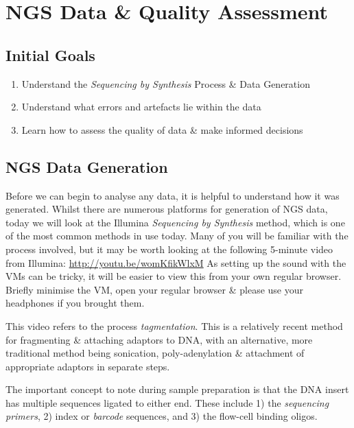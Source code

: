 \chapter{NGS Data \& Quality Assessment}

\section{Initial Goals}

\begin{enumerate}
\item Understand the \textit{Sequencing by Synthesis} Process \& Data Generation \\
\item Understand what errors and artefacts lie within the data \\
\item Learn how to assess the quality of data \& make informed decisions \\
\end{enumerate}

\section{NGS Data Generation}
\begin{steps}
Before we can begin to analyse any data, it is helpful to understand how it was generated.
Whilst there are numerous platforms for generation of NGS data, today we will look at the Illumina \textit{Sequencing by Synthesis} method, which is one of the most common methods in use today.
Many of you will be familiar with the process involved, but it may be worth looking at the following 5-minute video from Illumina: \url{http://youtu.be/womKfikWlxM} 
As setting up the sound with the VMs can be tricky, it will be easier to view this from your own regular browser.
Briefly minimise the VM, open your regular browser \& please use your headphones if you brought them. \\
\end{steps}

\begin{note}
This video refers to the process \textit{tagmentation}.%
This is a relatively recent method for fragmenting \& attaching adaptors to DNA, with an alternative, more traditional method being sonication, poly-adenylation \& attachment of appropriate adaptors in separate steps.
\end{note}

\begin{information}
The important concept to note during sample preparation is that the DNA insert has multiple sequences ligated to either end.
These include 1) the \textit{sequencing primers}, 2) index or \textit{barcode} sequences, and 3) the flow-cell binding oligos.
\end{information}

